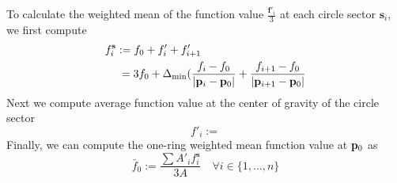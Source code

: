 To calculate the weighted mean of the function value $\frac{\mathbf{f}'_i}{3}$ at each circle sector $\mathbf{s}_i$, we first compute
\begin{align}
	f^{\mathbf{s}}_i &:= f_0 + f'_i + f'_{i+1} \\
		& \: = 3f_0 + \Delta_\text{min}(\frac{f_i-f_0}{|\mathbf{p}_i-\mathbf{p}_0|} + \frac{f_{i+1}-f_0}{|\mathbf{p}_{i+1}-\mathbf{p}_0|}
	\label{eq:avFuncValAtCoG}
\end{align}
%
Next we compute average function value at the center of gravity of the circle sector
\begin{equation}
	f'_i := 
	\label{eq:avFuncValAtCoG}
\end{equation}
%
Finally, we can compute the one-ring weighted mean function value at $\mathbf{p}_0$ as
\begin{equation}
	\bar{f}_0 := \frac{\sum A'_if^{\mathbf{s}}_i}{3A} \quad \forall i \in \{1,\ldots,n\}
	\label{eq:meanFuncValAtP0}
\end{equation}%
%

\bigskip
\bigskip
\bigskip
\bigskip
\bigskip
\bigskip
\bigskip
\bigskip

